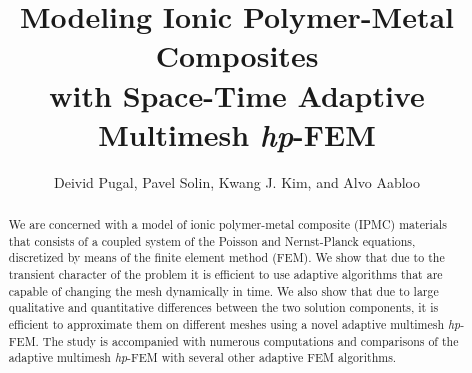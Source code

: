 \documentclass[mathpazo]{cicp}
\begin{document}
\title{Modeling Ionic Polymer-Metal Composites\\ with Space-Time Adaptive Multimesh \emph{hp}-FEM}


\author[Deivid Pugal et.~al.]{Deivid Pugal\comma{},
Pavel Solin\comma{}\comma\corrauth,
Kwang J. Kim, and Alvo Aabloo}

\address{\ Mechanical Engineering Department, University of Nevada, Reno, NV, U.S.A.\\
\ Department of Mathematics and Statistics, University of Nevada, Reno, NV, U.S.A.\\
\ Institute of Thermomechanics, Prague, Czech Republic\\
\ Institute of Technology, Tartu University, Estonia}


%
%
%
%
%

\begin{abstract}
We are concerned with a model of ionic polymer-metal composite (IPMC) materials
that consists of a coupled system of the Poisson and Nernst-Planck equations, 
discretized by means of the finite element method (FEM). We show that due to the 
transient character of the problem it is efficient to use adaptive algorithms 
that are capable of changing the mesh dynamically in time. We also show 
that due to large qualitative and quantitative differences between the 
two solution components, it is efficient to approximate them on different 
meshes using a novel adaptive multimesh \emph{hp}-FEM. The study is 
accompanied with numerous computations and comparisons of the adaptive 
multimesh \emph{hp}-FEM with several other adaptive FEM algorithms. 
\end{abstract}
\end{document}
